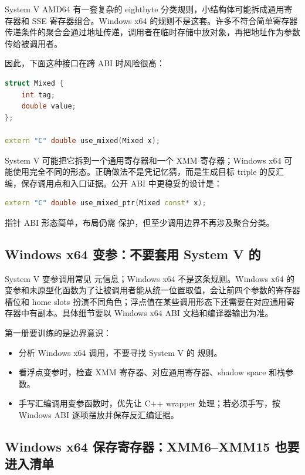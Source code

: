 System V AMD64 有一套复杂的 eightbyte 分类规则，小结构体可能拆成通用寄存器和 SSE 寄存器组合。Windows x64 的规则不是这套。许多不符合简单寄存器传递条件的聚合会通过地址传递，调用者在临时存储中放对象，再把地址作为参数传给被调用者。

因此，下面这种接口在跨 ABI 时风险很高：

\begin{lstlisting}[language=C++]
struct Mixed {
    int tag;
    double value;
};

extern "C" double use_mixed(Mixed x);
\end{lstlisting}

System V 可能把它拆到一个通用寄存器和一个 XMM 寄存器；Windows x64 可能使用完全不同的形态。正确做法不是凭记忆猜，而是生成目标 triple 的反汇编，保存调用点和入口证据。公开 ABI 中更稳妥的设计是：

\begin{lstlisting}[language=C++]
extern "C" double use_mixed_ptr(Mixed const* x);
\end{lstlisting}

指针 ABI 形态简单，布局仍需  保护，但至少调用边界不再涉及聚合分类。

\subsection{Windows x64 变参：不要套用 System V 的 }

System V 变参调用常见  元信息；Windows x64 不是这条规则。Windows x64 的变参和未原型化函数为了让被调用者能从统一位置取值，会让前四个参数的寄存器槽位和 home slots 扮演不同角色；浮点值在某些调用形态下还需要在对应通用寄存器中有副本。具体细节要以 Windows x64 ABI 文档和编译器输出为准。

第一册要训练的是边界意识：

\begin{itemize}
  \item 分析 Windows x64  调用，不要寻找 System V 的  规则。
  \item 看浮点变参时，检查 XMM 寄存器、对应通用寄存器、shadow space 和栈参数。
  \item 手写汇编调用变参函数时，优先让 C++ wrapper 处理；若必须手写，按 Windows ABI 逐项摆放并保存反汇编证据。
\end{itemize}

\subsection{Windows x64 保存寄存器：XMM6--XMM15 也要进入清单}

